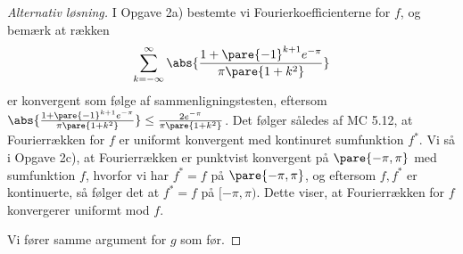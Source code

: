 \begin{opg}
\begin{enumerate}
\begin{proof}[Alternativ løsning]
I Opgave 2a) bestemte vi Fourierkoefficienterne for $f$, og bemærk at rækken
$$ \sum_{k=-\infty}^\infty \abs{\frac{1 + \pare{-1}^{k+1}e^{-\pi}}{\pi\pare{1+k^2}}} $$
er konvergent som følge af sammenligningstesten, eftersom $\abs{\frac{1+\pare{-1}^{k+1}e^{-\pi}}{\pi\pare{1+k^2}}}\leq\frac{2e^{-\pi}}{\pi\pare{1+k^2}}$. Det følger således af MC 5.12, at Fourierrækken for $f$ er uniformt konvergent med kontinuret sumfunktion $f^*$. Vi så i Opgave 2c), at Fourierrækken er punktvist konvergent på $\pare{-\pi,\pi}$ med sumfunktion $f$, hvorfor vi har $f^* = f$ på $\pare{-\pi,\pi}$, og eftersom $f,f
^*$ er kontinuerte, så følger det at $f^* = f$ på $[-\pi,\pi)$. Dette viser, at Fourierrækken for $f$ konvergerer uniformt mod $f$. 

Vi fører samme argument for $g$ som før.
\end{proof}
\end{enumerate}
\end{opg}

